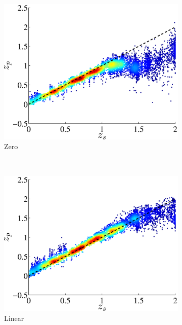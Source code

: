 \documentclass[useAMS,usenatbib,fleqn]{mn2e}
\begin{document}
\begin{figure}
       \begin{subfigure}[b]{0.24\textwidth}
                \includegraphics[width=\textwidth]{figures/22_0.eps}
                \caption{Zero}
        \end{subfigure}
        ~
        \begin{subfigure}[b]{0.24\textwidth}
                \includegraphics[width=\textwidth]{figures/22_L.eps}
                \caption{Linear}
        \end{subfigure}
        ~
        \begin{subfigure}[b]{0.24\textwidth}

\end{subfigure}
\end{figure}
\end{document}
